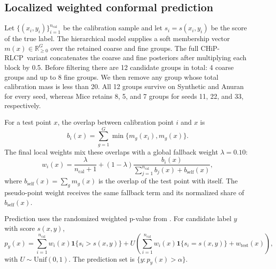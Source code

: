 \documentclass{article}
\newcommand{\chip}{CHiP-RLCP}
\begin{document}
\subsection{Localized weighted conformal prediction}
Let $\{(x_i,y_i)\}_{i=1}^{n_{\mathrm{cal}}}$ be the calibration sample and let $s_i=s(x_i,y_i)$ be the score of the true label. The hierarchical model supplies a soft membership vector $m(x)\in\mathbb{R}^G_{\ge 0}$ over the retained coarse and fine groups. The full \chip\ variant concatenates the coarse and fine posteriors after multiplying each block by 0.5. Before filtering there are 12 candidate groups in total: 4 coarse groups and up to 8 fine groups. We then remove any group whose total calibration mass is less than 20. All 12 groups survive on Synthetic and Anuran for every seed, whereas Mice retains 8, 5, and 7 groups for seeds 11, 22, and 33, respectively.

For a test point $x$, the overlap between calibration point $i$ and $x$ is
\begin{equation}
  b_i(x) = \sum_{g=1}^{G} \min\{m_g(x_i), m_g(x)\}.
\end{equation}
The final local weights mix these overlaps with a global fallback weight $\lambda=0.10$:
\begin{equation}
  w_i(x)
  =
  \frac{\lambda}{n_{\mathrm{cal}}+1}
  +
  (1-\lambda)\frac{b_i(x)}{\sum_{j=1}^{n_{\mathrm{cal}}} b_j(x) + b_{\mathrm{self}}(x)},
\end{equation}
where $b_{\mathrm{self}}(x)=\sum_g m_g(x)$ is the overlap of the test point with itself. The pseudo-point weight receives the same fallback term and its normalized share of $b_{\mathrm{self}}(x)$.

Prediction uses the randomized weighted p-value from \citet{hore2025localweights}. For candidate label $y$ with score $s(x,y)$,
\begin{equation}
  p_y(x)
  =
  \sum_{i=1}^{n_{\mathrm{cal}}} w_i(x)\mathbf{1}\{s_i > s(x,y)\}
  +
  U\!\left(
    \sum_{i=1}^{n_{\mathrm{cal}}} w_i(x)\mathbf{1}\{s_i = s(x,y)\}
    + w_{\mathrm{test}}(x)
  \right),
\end{equation}
with $U\sim \mathrm{Unif}(0,1)$. The prediction set is $\{y : p_y(x) > \alpha\}$.
\end{document}
